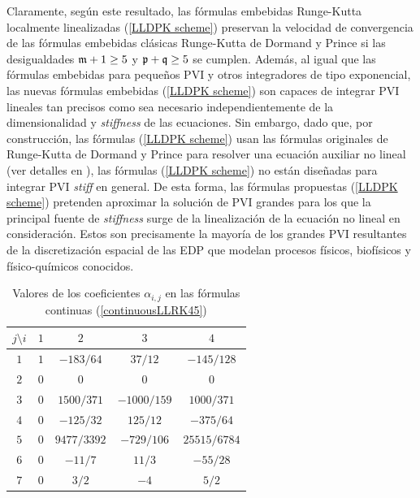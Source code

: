 Claramente, según este resultado, las fórmulas embebidas Runge-Kutta localmente linealizadas (\ref{LLDPK scheme}) preservan la velocidad de convergencia de las fórmulas embebidas clásicas Runge-Kutta de Dormand y Prince si las desigualdades $\mathfrak{m}+1 \ge 5 $ y $\mathfrak{p}+\mathfrak{q} \ge 5$ se cumplen. Además, al igual que las fórmulas embebidas para pequeños PVI y otros integradores de tipo exponencial, las nuevas fórmulas embebidas (\ref{LLDPK scheme}) son capaces de integrar PVI lineales tan precisos como sea necesario independientemente de la dimensionalidad y \textit{stiffness} de las ecuaciones. Sin embargo, dado que, por construcción, las fórmulas (\ref{LLDPK scheme}) usan las fórmulas originales de Runge-Kutta de Dormand y Prince para resolver una ecuación auxiliar no lineal (ver detalles en \cite{Jimenez13, Jimenez14AMC}), las fórmulas (\ref{LLDPK scheme}) no están diseñadas para integrar PVI \textit{stiff} en general. De esta forma, las fórmulas propuestas (\ref{LLDPK scheme}) pretenden aproximar la solución de PVI grandes para los que la principal fuente de \textit{stiffness} surge de la linealización de la ecuación no lineal en consideración. Estos son precisamente la mayoría de los grandes PVI resultantes de la discretización espacial de las EDP que modelan procesos físicos, biofísicos y físico-químicos conocidos.
\begin{table}[h]
	\caption{ Valores de los coeficientes $\alpha _{i,j}$ en las fórmulas continuas (\ref{continuousLLRK45})\label{Table continuous RK}}
	\centering
	\begin{tabular}{ccccc}
		\hline
		$j\setminus i$ & $1$ & $2$ & $3$ & $4$ \\
		\hline
		$1$ & $1$ & $-183/64$ & $37/12$ & $-145/128$ \\
		$2$ & $0$ & $0$ & $0$ & $0$ \\
		$3$ & $0$ & $1500/371$ & $-1000/159$ & $1000/371$ \\
		$4$ & $0$ & $-125/32$ & $125/12$ & $-375/64$ \\
		$5$ & $0$ &	$9477/3392$ & $-729/106$ & $25515/6784$ \\
		$6$ & $0$ &	$-11/7$ & $11/3$ & $-55/28$ \\
		$7$ & $0$ & $3/2$ & $-4$ & $5/2$ \\
		\hline
	\end{tabular}
\end{table}

